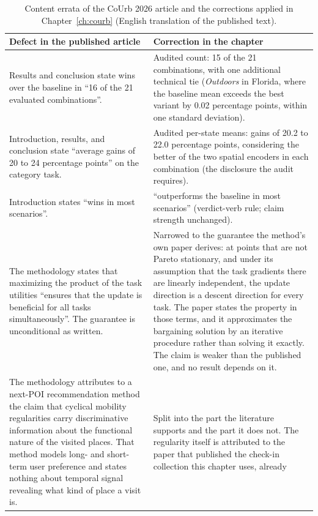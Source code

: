 \begin{table}[htb]
\caption{Content errata of the CoUrb 2026 article and the corrections applied in
Chapter~\ref{ch:courb} (English translation of the published text).}
\label{tab:apx:courb-errata}
\centering
\small
\begin{tabular}{@{}p{}p{}@{}}
\toprule
\textbf{Defect in the published article} & \textbf{Correction in the chapter} \\
\midrule
Results and conclusion state wins over the baseline in ``16 of the 21
evaluated combinations''. &
Audited count: 15 of the 21 combinations, with one additional technical tie
(\emph{Outdoors} in Florida, where the baseline mean exceeds the best variant by
0.02 percentage points, within one standard deviation). \\
\addlinespace
Introduction, results, and conclusion state ``average gains of 20 to 24
percentage points'' on the category task. &
Audited per-state means: gains of 20.2 to 22.0 percentage points, considering the
better of the two spatial encoders in each combination (the disclosure the audit
requires). \\
\addlinespace
Introduction states ``wins in most scenarios''. &
``outperforms the baseline in most scenarios'' (verdict-verb rule; claim
strength unchanged). \\
\addlinespace
The methodology states that maximizing the product of the task utilities ``ensures that the
update is beneficial for all tasks simultaneously''. The guarantee is unconditional as
written. &
Narrowed to the guarantee the method's own paper derives: at points that are not Pareto
stationary, and under its assumption that the task gradients there are linearly independent,
the update direction is a descent direction for every task. The paper states the property in
those terms, and it approximates the bargaining solution by an iterative procedure rather than
solving it exactly. The claim is weaker than the published one, and no result depends on
it. \\
\addlinespace
The methodology attributes to a next-POI recommendation method the claim that cyclical
mobility regularities carry discriminative information about the functional nature of the
visited places. That method models long- and short-term user preference and states nothing
about temporal signal revealing what kind of place a visit is. &
Split into the part the literature supports and the part it does not. The regularity itself is
attributed to the paper that published the check-in collection this chapter uses, already

\end{tabular}
\end{table}
